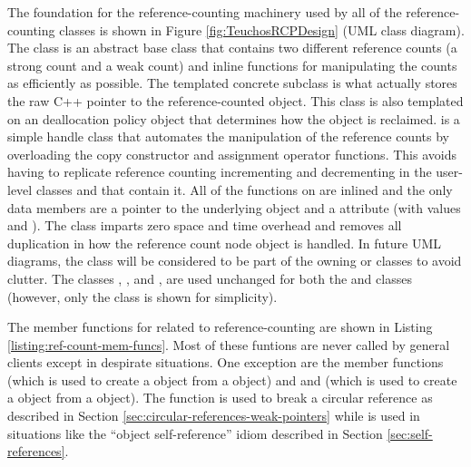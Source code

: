 \documentclass[pdf,ps2pdf,11pt]{SANDreport}
\begin{document}
The foundation for the reference-counting machinery used by all of the
reference-counting classes is shown in Figure
{}\ref{fig:TeuchosRCPDesign} (UML class diagram).  The class
{} is an abstract base class that contains two
different reference counts (a strong count and a weak count) and
inline functions for manipulating the counts as efficiently as
possible.  The templated concrete subclass {} is
what actually stores the raw C++ pointer to the reference-counted
object.  This class is also templated on an deallocation policy object
that determines how the object is reclaimed.  {}
is a simple handle class that automates the manipulation of the
reference counts by overloading the copy constructor and assignment
operator functions.  This avoids having to replicate reference
counting incrementing and decrementing in the user-level classes
{} and {} that contain it.  All of the
functions on {} are inlined and the only data
members are a pointer to the underlying {} object and
a {} attribute (with values {}
and {}).  The class {} imparts
zero space and time overhead and removes all duplication in how the
reference count node object is handled.  In future UML diagrams, the
{} class will be considered to be part of the
owning {} or {} classes to avoid clutter.
The classes {}, {}, and
{}, are used unchanged for both the
{} and {} classes (however, only the
{} class is shown for simplicity).

The member functions for {} {} related to
reference-counting are shown in Listing
{}\ref{listing:ref-count-mem-funcs}.  Most of these funtions are never
called by general clients except in despirate situations.  One
exception are the member functions {} (which is
used to create a {} {} object from a
{} object) and and {} (which
is used to create a {} {} object from a
{} object).  The function {} is
used to break a circular reference as described in Section
{}\ref{sec:circular-references-weak-pointers} while
{} is used in situations like the ``object
self-reference'' idiom described in Section
{}\ref{sec:self-references}.
\end{document}

